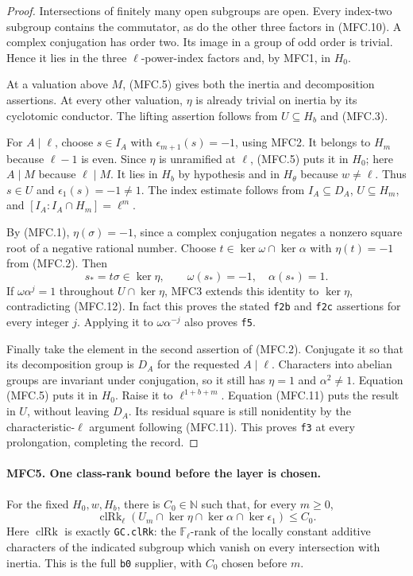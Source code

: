 \begin{proof}
Intersections of finitely many open subgroups are open.
Every index-two subgroup contains the commutator, as do the other
three factors in (MFC.10).  A complex conjugation has order two.
Its image in a group of odd order is trivial.  Hence it lies in
the three \(\ell\)-power-index factors and, by MFC1, in \(H_0\).

At a valuation above \(M\), (MFC.5) gives both the inertia and
decomposition assertions.  At every other valuation, \(\eta\)
is already trivial on inertia by its cyclotomic conductor.
The lifting assertion follows from \(U\subseteq H_b\) and
(MFC.3).

For \(A\mid\ell\), choose \(s\in I_A\) with
\(\epsilon_{m+1}(s)=-1\), using MFC2.  It belongs to \(H_m\)
because \(\ell-1\) is even.  Since \(\eta\) is unramified
at \(\ell\), (MFC.5) puts it in \(H_0\); here \(A\mid M\)
because \(\ell\mid M\).  It lies in \(H_b\) by hypothesis
and in \(H_\theta\) because \(w\ne\ell\).  Thus \(s\in U\)
and \(\epsilon_1(s)=-1\ne1\).  The index estimate follows
from \(I_A\subseteq D_A\), \(U\subseteq H_m\), and
\([I_A:I_A\cap H_m]=\ell^m\).

By (MFC.1), \(\eta(\sigma)=-1\), since a complex conjugation
negates a nonzero square root of a negative rational number.
Choose \(t\in\ker\omega\cap\ker\alpha\) with
\(\eta(t)=-1\) from (MFC.2).  Then
\[
 s_*=t\sigma\in\ker\eta,\qquad
                  \omega(s_*)=-1,\quad\alpha(s_*)=1.       \tag{MFC.12}
\]
If \(\omega\alpha^j=1\) throughout \(U\cap\ker\eta\),
MFC3 extends this identity to \(\ker\eta\), contradicting
(MFC.12).  In fact this proves the stated \texttt{f2b} and
\texttt{f2c} assertions for every integer \(j\).  Applying it
to \(\omega\alpha^{-j}\) also proves \texttt{f5}.

Finally take the element in the second assertion of (MFC.2).
Conjugate it so that its decomposition group is \(D_A\) for
the requested \(A\mid\ell\).  Characters into abelian groups
are invariant under conjugation, so it still has \(\eta=1\)
and \(\alpha^2\ne1\).  Equation (MFC.5) puts it in \(H_0\).
Raise it to \(\ell^{1+b+m}\).  Equation (MFC.11) puts the
result in \(U\), without leaving \(D_A\).  Its residual
square is still nonidentity by the characteristic-\(\ell\)
argument following (MFC.11).  This proves \texttt{f3} at every
prolongation, completing the record.
\end{proof}

\paragraph{MFC5. One class-rank bound before the layer is chosen.}
\label{claim:MFC5}
For the fixed \(H_0,w,H_b\), there is \(C_0\in\mathbb N\)
such that, for every \(m\ge0\),
\[
 \operatorname{clRk}_\ell
  (U_m\cap\ker\eta\cap\ker\alpha\cap\ker\epsilon_1)
                         \le C_0.                         \tag{MFC.13}
\]
Here \(\operatorname{clRk}\) is exactly \texttt{GC.clRk}:
the \(\mathbb F_\ell\)-rank of the locally constant additive
characters of the indicated subgroup which vanish on every
intersection with inertia.  This is the full \texttt{b0}
supplier, with \(C_0\) chosen before \(m\).

